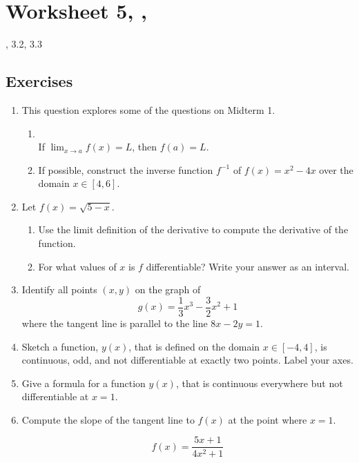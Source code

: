 \newpage\section*{Worksheet 5, \Course, \Semester} 
\noindent {}, 3.2, 3.3

\subsection*{Exercises}

\begin{enumerate}

    \item This question explores some of the questions on Midterm 1.     
    \begin{enumerate}
        \item \TorFShort \\If $\displaystyle{\lim_{x\rightarrow a} f(x) =L}$, then $f(a) = L$.   		\item If possible, construct the inverse function $f^{-1}$ of $f(x) = x^2 -4x$ over the domain $x \in [4,6]$.
    \end{enumerate}
    \item Let $f(x)=\sqrt{5-x}$.
	\begin{enumerate}
		\item Use the limit definition of the derivative to compute the derivative of the function.
		\item For what values of $x$ is $f$ differentiable? Write your answer as an interval. 
	\end{enumerate}
    \item Identify all points $(x,y)$ on the graph of
  $$g(x)=\frac{1}{3}x^3-\frac{3}{2}x^2+1$$ where the tangent line is parallel to the line $8x-2y=1$.

	\item Sketch a function, $y(x)$, that is defined on the domain $x\in[-4,4]$, is continuous, odd, and not differentiable at exactly two points. Label your axes. 
    \item Give a formula for a function $y(x)$, that is continuous everywhere but not differentiable at $x = 1$.
    \item Compute the slope of the tangent line to $f(x)$ at the point where $x = 1$.
    
    $$f(x) = \frac{5x + 1}{4x^2 + 1}$$
\end{enumerate}    